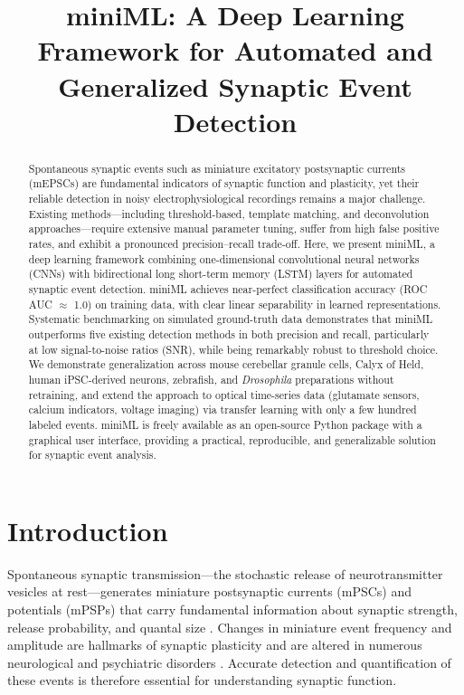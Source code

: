 \documentclass[11pt]{article}
\title{miniML: A Deep Learning Framework for Automated and Generalized Synaptic Event Detection}
\author{%
}
\date{}
\begin{document}
\maketitle

\begin{abstract}
Spontaneous synaptic events such as miniature excitatory postsynaptic currents (mEPSCs) are fundamental indicators of synaptic function and plasticity, yet their reliable detection in noisy electrophysiological recordings remains a major challenge. Existing methods---including threshold-based, template matching, and deconvolution approaches---require extensive manual parameter tuning, suffer from high false positive rates, and exhibit a pronounced precision--recall trade-off. Here, we present miniML, a deep learning framework combining one-dimensional convolutional neural networks (CNNs) with bidirectional long short-term memory (LSTM) layers for automated synaptic event detection. miniML achieves near-perfect classification accuracy (ROC AUC $\approx$ 1.0) on training data, with clear linear separability in learned representations. Systematic benchmarking on simulated ground-truth data demonstrates that miniML outperforms five existing detection methods in both precision and recall, particularly at low signal-to-noise ratios (SNR), while being remarkably robust to threshold choice. We demonstrate generalization across mouse cerebellar granule cells, Calyx of Held, human iPSC-derived neurons, zebrafish, and \textit{Drosophila} preparations without retraining, and extend the approach to optical time-series data (glutamate sensors, calcium indicators, voltage imaging) via transfer learning with only a few hundred labeled events. miniML is freely available as an open-source Python package with a graphical user interface, providing a practical, reproducible, and generalizable solution for synaptic event analysis.
\end{abstract}

\section{Introduction}

Spontaneous synaptic transmission---the stochastic release of neurotransmitter vesicles at rest---generates miniature postsynaptic currents (mPSCs) and potentials (mPSPs) that carry fundamental information about synaptic strength, release probability, and quantal size \citep{Katz1952,Fatt1952,Bhatt2009}. Changes in miniature event frequency and amplitude are hallmarks of synaptic plasticity \citep{Bhatt2009,Bhatt2013} and are altered in numerous neurological and psychiatric disorders \citep{Bhatt2020,Bhatt2021}. Accurate detection and quantification of these events is therefore essential for understanding synaptic function.
\end{document}
